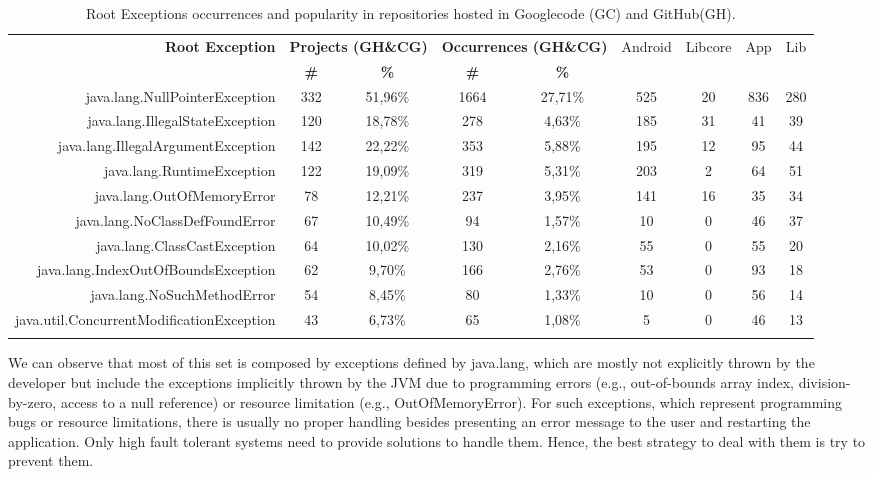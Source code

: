 \documentclass[conference]{IEEEtran}
\begin{document}
\begin{table}
  \centering
  \begin{tabular}{rcccccccc}
    \hline
    \bfseries{Root Exception} &  \multicolumn{2}{c}{\bfseries{Projects (GH\&CG)}} &  \multicolumn{2}{c}{\bfseries{Occurrences (GH\&CG)}} & \textsf{Android} & \textsf{Libcore} & \textsf{App} & \textsf{Lib} \\
    & \bfseries{\#} &  \bfseries{\%} & \bfseries{\# } & \bfseries{\% } &&&&\\
    \hline

java.lang.NullPointerException	&	332	&	51,96\%	&	1664	&	27,71\%	&	525	&	20	&	836	&	280	\\
java.lang.IllegalStateException	&	120	&	18,78\%	&	278	&	4,63\%	&	185	&	31	&	41	&	39	\\
java.lang.IllegalArgumentException	&	142	&	22,22\%	&	353	&	5,88\%	&	195	&	12	&	95	&	44	\\
java.lang.RuntimeException	&	122	&	19,09\%	&	319	&	5,31\%	&	203	&	2	&	64	&	51	\\
java.lang.OutOfMemoryError	&	78	&	12,21\%	&	237	&	3,95\%	&	141	&	16	&	35	&	34	\\
java.lang.NoClassDefFoundError	&	67	&	10,49\%	&	94	&	1,57\%	&	10	&	0	&	46	&	37	\\
java.lang.ClassCastException	&	64	&	10,02\%	&	130	&	2,16\%	&	55	&	0	&	55	&	20	\\
java.lang.IndexOutOfBoundsException	&	62	&	9,70\%	&	166	&	2,76\%	&	53	&	0	&	93	&	18	\\
java.lang.NoSuchMethodError	&	54	&	8,45\%	&	80	&	1,33\%	&	10	&	0	&	56	&	14	\\
java.util.ConcurrentModificationException	&	43	&	6,73\%	&	65	&	1,08\%	&	5	&	0	&	46	&	13	\\
\\

    \hline
  \end{tabular}
\caption{Root Exceptions occurrences and popularity in repositories hosted in Googlecode (GC) and GitHub(GH).}
\label{tab:topten}
\end{table}

 

We can observe that most of this set is composed by exceptions defined by java.lang,
which are mostly not explicitly thrown by the developer but include
the exceptions implicitly thrown by the JVM due to programming errors 
(e.g., out-of-bounds array index, division-by-zero, access to a null reference)
 or resource limitation (e.g., OutOfMemoryError).
For such exceptions, which represent programming bugs or resource limitations, 
there is usually no proper handling besides presenting an error message to
 the user and restarting the application. Only high fault tolerant systems need to 
provide solutions to handle them. Hence, the best strategy to deal with them
is try to prevent them.
\end{document}
